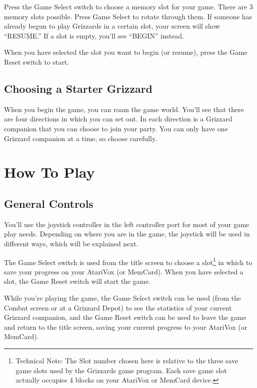 \documentclass[12pt,twoside,openright,book]{memoir}
\begin{document}
Press the  Game Select  switch to  choose a memory  slot for  your game.
There are 3  memory slots possible. Press Game Select  to rotate through
them. If someone has already begun  to play Grizzards in a certain slot,
your  screen will  show  ``RESUME.''  If a  slot  is  empty, you'll  see
``BEGIN'' instead.

When you have selected the slot you want to begin (or resume), press the
Game Reset switch to start.

\section{Choosing a Starter Grizzard}

When you begin  the game, you can  roam the game world.  You'll see that
there are four directions in which you can set out. In each direction is
a Grizzard  companion that you  can choose to  join your party.  You can
only have one Grizzard companion at a time, so choose carefully.

\chapter{How To Play}

\section{General Controls}

You'll use the joystick controller in the left controller port for most of
your game play needs. Depending on where you are in the game, the joystick
will be used in different ways, which will be explained next.

The  Game  Select  switch  is  used from  the  title  screen  to  choose
a slot\footnote{Technical Note: The Slot  number chosen here is relative
  to  the three  save game  slots used  by the  Grizzards game  program.
  Each save  game slot actually  occupies 4  blocks on your  AtariVox or
  MemCard device.} in  which to save your progress on  your AtariVox (or
MemCard). When  you have  selected a  slot, the  Game Reset  switch will
start the game.

While you're playing the game, the Game Select switch can be used (from the
Combat screen or at a Grizzard Depot) to see the statistics of your current
Grizzard companion, and the Game Reset switch can be used to leave the game
and return to the title screen, saving your current progress to your
AtariVox (or MemCard).
\end{document}
